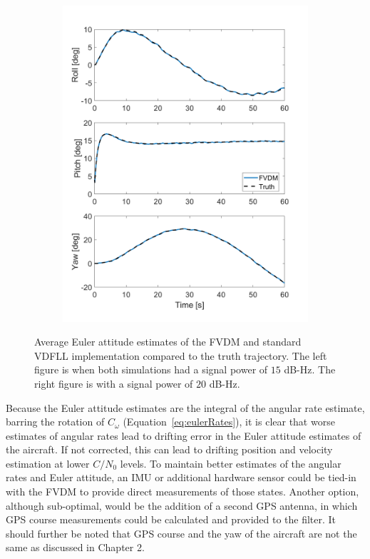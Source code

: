 \begin{figure}[!ht]
\begin{subfigure}{.45\textwidth}
        \includegraphics[width=1\linewidth]{Figures/dynamic/20/EULERANGLES.png}
    \end{subfigure}
    \caption{Average Euler attitude estimates of the FVDM and standard VDFLL implementation compared to the truth trajectory. The left figure is when both simulations had a signal power of \(15\) dB-Hz. The right figure is with a signal power of \(20\) dB-Hz.}\label{fig:EULER}
\end{figure}

Because the Euler attitude estimates are the integral of the angular rate estimate, barring the rotation of \(C_{\omega}\) (Equation~\ref{eq:eulerRates}), it is clear that worse estimates of angular rates lead to drifting error in the Euler attitude estimates of the aircraft. If not corrected, this can lead to drifting position and velocity estimation at lower \(C/N_0\) levels. To maintain better estimates of the angular rates and Euler attitude, an IMU or additional hardware sensor could be tied-in with the FVDM to provide direct measurements of those states. Another option, although sub-optimal, would be the addition of a second GPS antenna, in which GPS course measurements could be calculated and provided to the filter. It should further be noted that GPS course and the yaw of the aircraft are not the same as discussed in Chapter 2.

